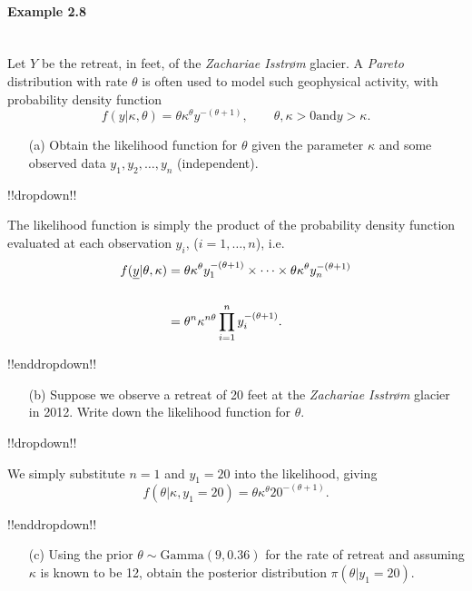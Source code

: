 \clearpage
\paragraph{Example 2.8}{~\\
Let $Y$ be the retreat, in feet, of the  \textit{Zachariae Isstr\o m} glacier.  A \textit{Pareto} distribution with rate $\theta$ is often used to model such geophysical activity, with probability density function 
$$
f(y|\kappa,\theta) = \theta\kappa^{\theta}y^{-(\theta+1)}, \qquad \theta,\kappa>0 \mathrm{ and } y>\kappa.  
$$

\begin{itemize}
\item [(a)] Obtain the likelihood function for $\theta$ given the parameter $\kappa$ and some observed data $y_{1}, y_{2}, \ldots, y_{n}$ (independent).
\end{itemize}

!!dropdown!!

The likelihood function is simply the product of the probability density function evaluated at each observation $y_{i}$, ($i=1, \ldots, n$), i.e.
    \begin{align*}
    f(\underline{y} | \theta, \kappa) &= \theta\kappa^{\theta}y_{1}^{-(\theta+1)} \times \cdots \times \theta\kappa^{\theta}y_{n}^{-(\theta+1)}  \notag \\
                                   & \notag \\
                                   &= \theta^{n} \kappa^{n\theta} \prod_{i=1}^{n}y_{i}^{-(\theta+1)}.
    \end{align*}

!!enddropdown!!

\begin{itemize}
\item [(b)] Suppose we observe a retreat of 20 feet at the  \textit{Zachariae Isstr\o m} glacier in 2012.  Write down the likelihood function for $\theta$.
\end{itemize}

!!dropdown!!

We simply substitute $n=1$ and $y_{1}=20$ into the likelihood, giving
        $$
        f(\theta|\kappa,y_{1}=20)     =\theta \kappa^{\theta} 20^{-(\theta+1)}.
        $$

!!enddropdown!!

\clearpage

\begin{itemize}
\item [(c)] Using the prior $\theta \sim \mathrm{Gamma}(9,0.36)$ for the rate of retreat and assuming $\kappa$ is known to be 12, obtain the posterior distribution $\pi(\theta|y_{1}=20)$.  
\end{itemize}

}
